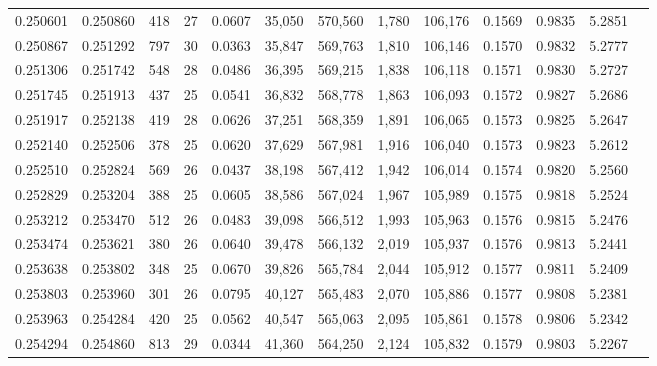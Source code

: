 \begin{tabular}{rrrrrrrrrrrrr}
0.250601 & 0.250860 & 418 &  27 &                                     0.0607 &  35,050 & 570,560 &   1,780 & 106,176 & 0.1569 & 0.9835 & 5.2851 \\
0.250867 & 0.251292 & 797 &  30 &                                     0.0363 &  35,847 & 569,763 &   1,810 & 106,146 & 0.1570 & 0.9832 & 5.2777 \\
0.251306 & 0.251742 & 548 &  28 &                                     0.0486 &  36,395 & 569,215 &   1,838 & 106,118 & 0.1571 & 0.9830 & 5.2727 \\
0.251745 & 0.251913 & 437 &  25 &                                     0.0541 &  36,832 & 568,778 &   1,863 & 106,093 & 0.1572 & 0.9827 & 5.2686 \\
0.251917 & 0.252138 & 419 &  28 &                                     0.0626 &  37,251 & 568,359 &   1,891 & 106,065 & 0.1573 & 0.9825 & 5.2647 \\
0.252140 & 0.252506 & 378 &  25 &                                     0.0620 &  37,629 & 567,981 &   1,916 & 106,040 & 0.1573 & 0.9823 & 5.2612 \\
0.252510 & 0.252824 & 569 &  26 &                                     0.0437 &  38,198 & 567,412 &   1,942 & 106,014 & 0.1574 & 0.9820 & 5.2560 \\
0.252829 & 0.253204 & 388 &  25 &                                     0.0605 &  38,586 & 567,024 &   1,967 & 105,989 & 0.1575 & 0.9818 & 5.2524 \\
0.253212 & 0.253470 & 512 &  26 &                                     0.0483 &  39,098 & 566,512 &   1,993 & 105,963 & 0.1576 & 0.9815 & 5.2476 \\
0.253474 & 0.253621 & 380 &  26 &                                     0.0640 &  39,478 & 566,132 &   2,019 & 105,937 & 0.1576 & 0.9813 & 5.2441 \\
0.253638 & 0.253802 & 348 &  25 &                                     0.0670 &  39,826 & 565,784 &   2,044 & 105,912 & 0.1577 & 0.9811 & 5.2409 \\
0.253803 & 0.253960 & 301 &  26 &                                     0.0795 &  40,127 & 565,483 &   2,070 & 105,886 & 0.1577 & 0.9808 & 5.2381 \\
0.253963 & 0.254284 & 420 &  25 &                                     0.0562 &  40,547 & 565,063 &   2,095 & 105,861 & 0.1578 & 0.9806 & 5.2342 \\
0.254294 & 0.254860 & 813 &  29 &                                     0.0344 &  41,360 & 564,250 &   2,124 & 105,832 & 0.1579 & 0.9803 & 5.2267 \\

\end{tabular}
